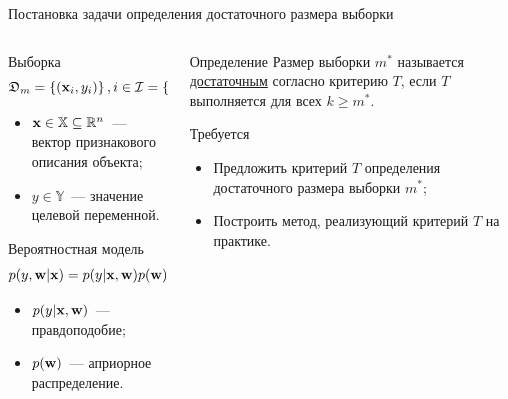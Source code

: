 \documentclass[aspectratio=169]{beamer}
\begin{document}
\begin{frame}{Постановка задачи определения достаточного размера выборки}
    \begin{columns}[t]
    \begin{column}{0.48\textwidth}
        \vspace{-0.5cm}
        \begin{block}{Выборка}
            \vspace{-0.7cm}
            \[ \mathfrak{D}_m = \left\{ (\mathbf{x}_i, y_i) \right\}, i \in \mathcal{I} = \{ 1, \ldots, m \} \]
            \vspace{-1cm}
            \begin{itemize}
                \item $\mathbf{x} \in \mathbb{X} \subseteq \mathbb{R}^n$~--- вектор признакового описания объекта;
                \item $y \in \mathbb{Y}$~--- значение целевой переменной.
            \end{itemize}
        \end{block}
        \begin{block}{Вероятностная модель}
            \vspace{-0.7cm}
            \[ p(y, \mathbf{w} | \mathbf{x}) = p(y | \mathbf{x}, \mathbf{w}) p(\mathbf{w}): \mathbb{Y} \times \mathbb{W} \times \mathbb{X} \to \mathbb{R}^+ \]
            \vspace{-1cm}
            \begin{itemize}
                \item $p(y | \mathbf{x}, \mathbf{w})$~--- правдоподобие;
                \item $p(\mathbf{w})$~--- априорное распределение.
            \end{itemize}
        \end{block}
    \end{column}
    \hspace{0.5cm}
    \vrule
    \hspace{0.5cm}
    \begin{column}{0.48\textwidth}
        \vspace{-0.5cm}
        \begin{block}{Определение}
            Размер выборки $m^*$ называется \underline{достаточным} согласно критерию $T$, если $T$ выполняется для всех $k \geqslant m^*$.
        \end{block}
        \vspace{0.5cm}
        \begin{block}{Требуется}
            \begin{itemize}
                \item Предложить критерий $T$ определения достаточного размера выборки $m^*$;
                \item Построить метод, реализующий критерий $T$ на практике.
            \end{itemize}
        \end{block}
    \end{column}
\end{columns}
\end{frame}
\end{document}
